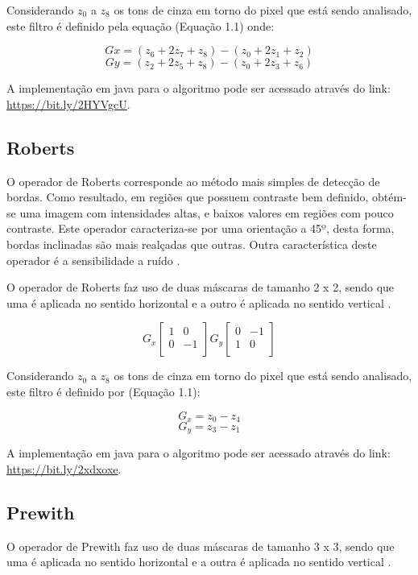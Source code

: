 \documentclass[
	12pt,				%
	oneside,			%
	a4paper,			%
	english,			%
	french,				%
	spanish,			%
	brazil,				%
	]{abntex2}
\begin{document}
Considerando \(z_0\) a \(z_8\) os tons de cinza em torno do pixel que está sendo analisado, este filtro é definido pela equação (Equação 1.1) onde:

\[Gx = (z_6 + 2z_7 + z_8) - (z_0 + 2z_1 + z_2)\]
\[Gy = (z_2 + 2z_5 + z_8) - (z_0 + 2z_3 + z_6)\]

A implementação em java para o algoritmo pode ser acessado através do link: \url{https://bit.ly/2HYVgcU}.

\subsection{Roberts}
O operador de Roberts corresponde ao método mais simples de detecção de bordas. Como resultado, em regiões que possuem contraste bem definido, obtém-se uma imagem com intensidades altas, e baixos valores em regiões com pouco contraste. Este operador caracteriza-se por uma orientação a 45º, desta forma, bordas inclinadas são mais realçadas que outras. Outra característica deste operador é a sensibilidade a ruído \cite{conciAzevedoLeta:2008}.

O operador de Roberts faz uso de duas máscaras de tamanho 2 x 2, sendo que uma é aplicada no sentido horizontal e a outro é aplicada no sentido vertical \cite{pedriniSchwartz:2008}.


\[
G_x
\begin{bmatrix}
    1 &  0    \\ 
	0 & -1    \\    
\end{bmatrix} 
G_y
\begin{bmatrix}
    0 & -1   \\ 
	1 &  0   \\    
\end{bmatrix} 
\]

Considerando \(z_0\) a \(z_8\) os tons de cinza em torno do pixel que está sendo analisado, este filtro é definido por (Equação 1.1):

\[G_x = z_0 - z_4\]
\[G_y = z_3 -z_1\]

A implementação em java para o algoritmo pode ser acessado através do link: \url{https://bit.ly/2xdxoxe}.
\subsection{Prewith}

O operador de Prewith faz uso de duas máscaras de tamanho 3 x 3, sendo que uma é aplicada no sentido horizontal e a outra é aplicada no sentido vertical \cite{pedriniSchwartz:2008}.	
\end{document}
